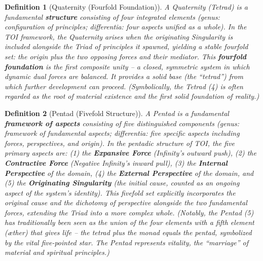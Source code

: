 \documentclass[11pt]{article}
\newtheorem{definition}{Definition}
\theoremstyle{plain}
\begin{document}
\begin{definition}[Quaternity (Fourfold Foundation)]
A \emph{Quaternity} (Tetrad) is a fundamental \textbf{structure} consisting of four integrated elements \textit{(genus: configuration of principles; differentia: four aspects unified as a whole)}. In the TOI framework, the Quaternity arises when the originating Singularity is included alongside the Triad of principles it spawned, yielding a stable fourfold set: the origin plus the two opposing forces and their mediator. This \textbf{fourfold foundation} is the first composite unity – a closed, symmetric system in which dynamic dual forces are balanced. It provides a solid base (the “tetrad”) from which further development can proceed. \textit{(Symbolically, the Tetrad (4) is often regarded as the root of material existence and the first solid foundation of reality.)}
\end{definition}

\begin{definition}[Pentad (Fivefold Structure)]
A \emph{Pentad} is a fundamental \textbf{framework of aspects} consisting of five distinguished components \textit{(genus: framework of fundamental aspects; differentia: five specific aspects including forces, perspectives, and origin)}. In the pentadic structure of TOI, the five primary aspects are: (1) the \textbf{Expansive Force} (Infinity’s outward push), (2) the \textbf{Contractive Force} (Negative Infinity’s inward pull), (3) the \textbf{Internal Perspective} of the domain, (4) the \textbf{External Perspective} of the domain, and (5) the \textbf{Originating Singularity} (the initial cause, counted as an ongoing aspect of the system’s identity). This fivefold set explicitly incorporates the original cause and the dichotomy of perspective alongside the two fundamental forces, extending the Triad into a more complex whole. \textit{(Notably, the Pentad (5) has traditionally been seen as the union of the four elements with a fifth element (æther) that gives life – the tetrad plus the monad equals the pentad, symbolized by the vital five-pointed star. The Pentad represents vitality, the “marriage” of material and spiritual principles.)}
\end{definition}
\end{document}
